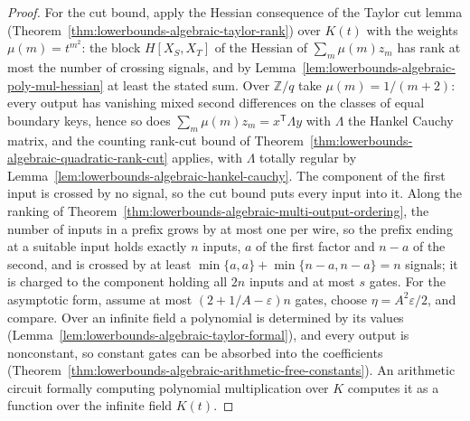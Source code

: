 \begin{proof}
  \leanok
  For the cut bound, apply the Hessian consequence of the Taylor cut lemma
  (Theorem~\ref{thm:lowerbounds-algebraic-taylor-rank}) over $K(t)$ with the
  weights $\mu(m)=t^{m^2}$: the block $H[X_S,X_T]$ of the Hessian of
  $\sum_m\mu(m)z_m$ has rank at most the number of crossing signals, and by
  Lemma~\ref{lem:lowerbounds-algebraic-poly-mul-hessian} at least the stated
  sum. Over $\mathbb{Z}/q$ take $\mu(m)=1/(m+2)$: every output has vanishing
  mixed second differences on the classes of equal boundary keys, hence so
  does $\sum_m\mu(m)z_m=x^{\mathsf T}\Lambda y$ with $\Lambda$ the Hankel Cauchy
  matrix, and the counting rank-cut bound of
  Theorem~\ref{thm:lowerbounds-algebraic-quadratic-rank-cut} applies, with
  $\Lambda$ totally regular by
  Lemma~\ref{lem:lowerbounds-algebraic-hankel-cauchy}. The component of the
  first input is crossed by no signal, so the cut bound puts every input
  into it. Along the ranking of
  Theorem~\ref{thm:lowerbounds-algebraic-multi-output-ordering}, the number of
  inputs in a prefix grows by at most one per wire, so the prefix ending at a
  suitable input holds exactly $n$ inputs, $a$ of the first factor and $n-a$
  of the second, and is crossed by at least $\min\{a,a\}+\min\{n-a,n-a\}=n$
  signals; it is charged to the component holding all $2n$ inputs and at
  most $s$ gates. For the asymptotic form, assume at most
  $(2+1/A-\varepsilon)n$ gates, choose $\eta=A^2\varepsilon/2$, and compare.
  Over an infinite field a polynomial is determined by its values
  (Lemma~\ref{lem:lowerbounds-algebraic-taylor-formal}), and every output is
  nonconstant, so constant gates can be absorbed into the coefficients
  (Theorem~\ref{thm:lowerbounds-algebraic-arithmetic-free-constants}). An
  arithmetic circuit formally computing polynomial multiplication over $K$
  computes it as a function over the infinite field $K(t)$.
\end{proof}

